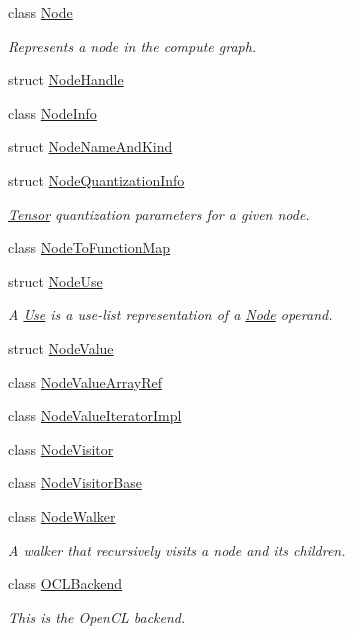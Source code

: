 \begin{DoxyCompactItemize}
class \hyperlink{classglow_1_1_node}{Node}
\begin{DoxyCompactList}\small\item\em Represents a node in the compute graph. \end{DoxyCompactList}\item 
struct \hyperlink{structglow_1_1_node_handle}{Node\+Handle}
\item 
class \hyperlink{classglow_1_1_node_info}{Node\+Info}
\item 
struct \hyperlink{structglow_1_1_node_name_and_kind}{Node\+Name\+And\+Kind}
\item 
struct \hyperlink{structglow_1_1_node_quantization_info}{Node\+Quantization\+Info}
\begin{DoxyCompactList}\small\item\em \hyperlink{classglow_1_1_tensor}{Tensor} quantization parameters for a given node. \end{DoxyCompactList}\item 
class \hyperlink{classglow_1_1_node_to_function_map}{Node\+To\+Function\+Map}
\item 
struct \hyperlink{structglow_1_1_node_use}{Node\+Use}
\begin{DoxyCompactList}\small\item\em A \textquotesingle{}\hyperlink{structglow_1_1_use}{Use}\textquotesingle{} is a use-\/list representation of a \hyperlink{classglow_1_1_node}{Node} operand. \end{DoxyCompactList}\item 
struct \hyperlink{structglow_1_1_node_value}{Node\+Value}
\item 
class \hyperlink{classglow_1_1_node_value_array_ref}{Node\+Value\+Array\+Ref}
\item 
class \hyperlink{classglow_1_1_node_value_iterator_impl}{Node\+Value\+Iterator\+Impl}
\item 
class \hyperlink{classglow_1_1_node_visitor}{Node\+Visitor}
\item 
class \hyperlink{classglow_1_1_node_visitor_base}{Node\+Visitor\+Base}
\item 
class \hyperlink{classglow_1_1_node_walker}{Node\+Walker}
\begin{DoxyCompactList}\small\item\em A walker that recursively visits a node and its children. \end{DoxyCompactList}\item 
class \hyperlink{classglow_1_1_o_c_l_backend}{O\+C\+L\+Backend}
\begin{DoxyCompactList}\small\item\em This is the Open\+CL backend. \end{DoxyCompactList}\item 

\end{DoxyCompactItemize}
